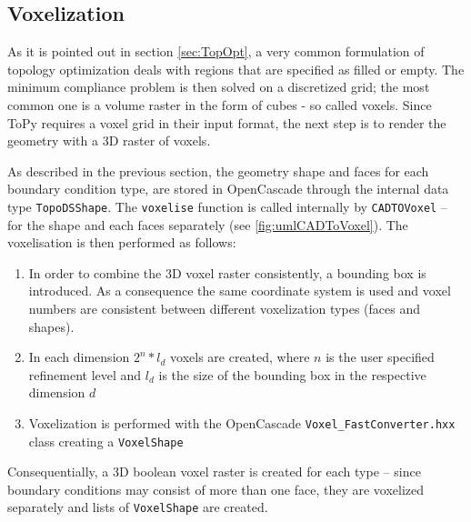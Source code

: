\subsection{Voxelization}
\label{sec: Voxelization}

As it is pointed out in section \ref{sec:TopOpt}, a very common formulation of topology optimization deals with regions that are specified as filled or empty. The minimum compliance problem is then solved on a discretized grid; the most common one is a volume raster in the form of cubes - so called voxels. Since ToPy requires a voxel grid in their input format, the next step is to render the geometry with a 3D raster of voxels.

As described in the previous section, the geometry shape and faces for each boundary condition type, are stored in OpenCascade through the internal data type \lstinline|TopoDSShape|. The \lstinline|voxelise| function is called internally by \lstinline|CADTOVoxel| -- for the shape and each faces separately (see \autoref{fig:umlCADToVoxel}). The voxelisation is then performed as follows: 
\begin{enumerate}
\item In order to combine the 3D voxel raster consistently, a bounding box is introduced. As a consequence the same coordinate system is used and voxel numbers are consistent between different voxelization types (faces and shapes). 
\item In each dimension $2^n*l_d$ voxels are created, where $n$ is the user specified refinement level and $l_d$ is the size of the bounding box in the respective dimension $d$
\item Voxelization is performed with the OpenCascade  \lstinline|Voxel_FastConverter.hxx| class creating a \lstinline|VoxelShape|
\end{enumerate}

Consequentially, a 3D boolean voxel raster is created for each type -- since boundary conditions may consist of more than one face, they are voxelized separately and lists of \lstinline|VoxelShape| are created. 
